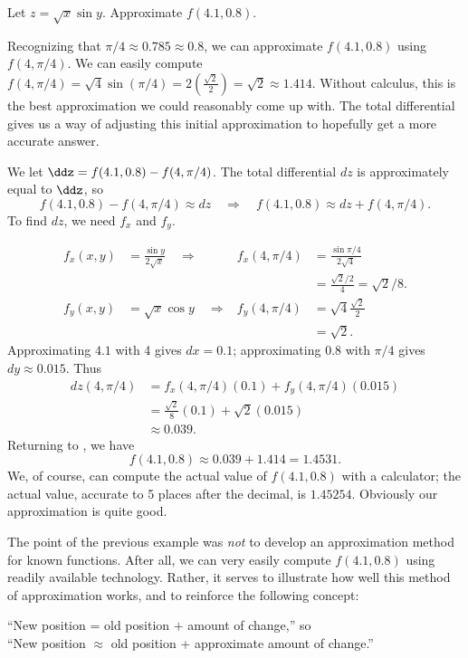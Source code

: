 {Let $z = \sqrt{x}\sin y$. Approximate $f(4.1,0.8)$.}
{Recognizing that $\pi/4 \approx 0.785\approx 0.8$, we can approximate $f(4.1,0.8)$ using $f(4,\pi/4)$. We can easily compute $f(4,\pi/4) = \sqrt{4}\sin(\pi/4) = 2\left(\frac{\sqrt{2}}2\right) = \sqrt{2}\approx 1.414.$ Without calculus, this is the best approximation we could reasonably come up with. The total differential gives us a way of adjusting this initial approximation to hopefully get a more accurate answer.

We let $\ddz = f(4.1,0.8) - f(4,\pi/4)$. The total differential $dz$ is approximately equal to $\ddz$, so
\begin{equation}f(4.1,0.8) - f(4,\pi/4) \approx dz \quad \Rightarrow \quad f(4.1,0.8) \approx dz + f(4,\pi/4).\label{eq:totaldiff2}\end{equation}
To find $dz$, we need $f_x$ and $f_y$.

\begin{align*}
f_x(x,y) &= \frac{\sin y}{2\sqrt{x}} \quad\Rightarrow&
f_x(4,\pi/4) &= \frac{\sin \pi/4}{2\sqrt{4}} \\
						& &&= \frac{\sqrt{2}/2}{4} = \sqrt{2}/8.\\
f_y(x,y) &= \sqrt{x}\cos y \quad\Rightarrow&
f_y(4,\pi/4) &= \sqrt{4}\frac{\sqrt{2}}2\\
		& & &= \sqrt{2}.
\end{align*}
Approximating $4.1$ with 4 gives $dx = 0.1$; approximating $0.8$ with $\pi/4$ gives $dy \approx 0.015$. Thus
\begin{align*}
dz(4,\pi/4) &=  f_x(4,\pi/4)(0.1) + f_y(4,\pi/4)(0.015)\\
				&= \frac{\sqrt{2}}8(0.1) + \sqrt{2}(0.015)\\
				&\approx 0.039.
\end{align*}
Returning to , we have
$$f(4.1,0.8) \approx 0.039 + 1.414 = 1.4531.$$
We, of course, can compute the actual value of $f(4.1,0.8)$ with a calculator; the actual value, accurate to 5 places after the decimal, is $1.45254$. Obviously our approximation is quite good.}

The point of the previous example was \textit{not} to develop an approximation method for known functions. After all, we can very easily compute $f(4.1,0.8)$ using readily available technology. Rather, it serves to illustrate how well this method of approximation works, and to reinforce the following concept:
\begin{center}
	``New position = old position $+$ amount of change,'' so\\
	``New position $\approx$ old position + approximate amount of change.''
\end{center}

